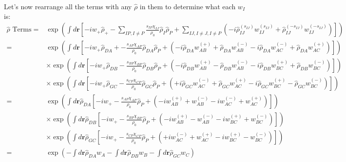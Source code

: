 \documentclass{article}
\begin{document}
Let's now rearrange all the terms with any $\hat{\rho}$ in them to determine
  what each $w_I$ is:
\begin{align*}
  \hat{\rho}\textrm{ Terms} =
    &\exp \left(
      \int d \mathbf{r} \left[
        - i w_+ \hat{\rho}_+
        -
        \sum_{IP,I \ne P}
        \frac{s_{IP}\chi_{IJ}}{\rho_0}
        \hat{\rho}_I \hat{\rho}_P
        +
        \sum_{IJ, I \ne J, I \ne P}
        \left(
          -i \hat{\rho}_{IJ}^{(s_{IJ})} w_{IJ}^{(s_{IJ})}
          + \hat{\rho}_{IJ}^{(-s_{IJ})} w_{IJ}^{(-s_{IJ})}
        \right)
      \right]
    \right) \\
  =
    &\exp \left(
      \int d \mathbf{r} \left[
        - i w_+ \hat{\rho}_{DA}
        +
        - \frac{s_{AP}\chi_{AP}}{\rho_0}
        \hat{\rho}_{DA} \hat{\rho}_P
        +
        \left(
          -i \hat{\rho}_{DA} w_{AB}^{(+)} + \hat{\rho}_{DA} w_{AB}^{(-)}
          -i \hat{\rho}_{DA} w_{AC}^{(-)} + \hat{\rho}_{DA} w_{AC}^{(+)}
        \right)
      \right]
    \right) \\
    &\times
    \exp \left(
      \int d \mathbf{r} \left[
        - i w_+ \hat{\rho}_{DB}
        -
        \frac{s_{BP}\chi_{BP}}{\rho_0}
        \hat{\rho}_{DB} \hat{\rho}_P
        +
        \left(
          -i \hat{\rho}_{DB} w_{AB}^{(+)} - \hat{\rho}_{DB} w_{AB}^{(-)}
          -i \hat{\rho}_{DB} w_{BC}^{(+)} + \hat{\rho}_{DB} w_{BC}^{(-)}
        \right)
      \right]
    \right) \\
    &\times
    \exp \left(
      \int d \mathbf{r} \left[
        - i w_+ \hat{\rho}_{GC}
        -
        \frac{s_{CP}\chi_{CP}}{\rho_0}
        \hat{\rho}_{GC} \hat{\rho}_P
        +
        \left(
          +i \hat{\rho}_{GC} w_{AC}^{(-)} + \hat{\rho}_{GC} w_{AC}^{(+)}
          -i \hat{\rho}_{GC} w_{BC}^{(+)} - \hat{\rho}_{GC} w_{BC}^{(-)}
        \right)
      \right]
    \right) \\
  =
    &\exp \left(
      \int d \mathbf{r} \hat{\rho}_{DA} \left[
        - i w_+ 
        -
        \frac{s_{AP}\chi_{AP}}{\rho_0}
        \hat{\rho}_P
        +
        \left(
          -i w_{AB}^{(+)} + w_{AB}^{(-)}
          -i w_{AC}^{(-)} + w_{AC}^{(+)}
        \right)
      \right]
    \right) \\
    &\times
    \exp \left(
      \int d \mathbf{r} \hat{\rho}_{DB} \left[
        - i w_+
        -
        \frac{s_{BP}\chi_{BP}}{\rho_0}
        \hat{\rho}_P
        +
        \left(
          -i w_{AB}^{(+)} - w_{AB}^{(-)}
          -i w_{BC}^{(+)} + w_{BC}^{(-)}
        \right)
      \right]
    \right) \\
    &\times
    \exp \left(
      \int d \mathbf{r} \hat{\rho}_{GC} \left[
        - i w_+
        -
        \frac{s_{CP}\chi_{CP}}{\rho_0}
        \hat{\rho}_P
        +
        \left(
          +i w_{AC}^{(-)} + w_{AC}^{(+)}
          -i w_{BC}^{(+)} - w_{BC}^{(-)}
        \right)
      \right]
    \right) \\
  =
    &\exp \left(
      - \int d \mathbf{r} \hat{\rho}_{DA} w_A
      - \int d \mathbf{r} \hat{\rho}_{DB} w_B
      - \int d \mathbf{r} \hat{\rho}_{GC} w_C
    \right) \\
\end{align*}
\end{document}
